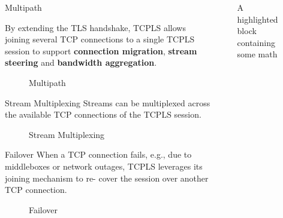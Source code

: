 \documentclass[final]{beamer}
\newlength{\sepwidth}
\newlength{\colwidth}
\newcommand{\separatorcolumn}{\begin{column}{\sepwidth}\end{column}}
\begin{document}
\begin{frame}[t]
\begin{columns}[t]
\begin{column}{\colwidth}
      \end{column}

      \separatorcolumn

      \begin{column}{\colwidth}
        \begin{block}{Multipath}

          By extending the TLS handshake, TCPLS allows joining several TCP connections to a
          single TCPLS session to support \textbf{connection migration},
          \textbf{stream steering} and \textbf{bandwidth aggregation}.
        \begin{figure}
          \centering
          
          \caption{Multipath}
          \label{fig:multipath}
        \end{figure}


        \end{block}

        \begin{block}{Stream Multiplexing}
          Streams can be multiplexed across the available TCP connections of the TCPLS session.
          \begin{figure}
            \centering
            
            \caption{Stream Multiplexing}
            \label{fig:stream-multiplex}
          \end{figure}
        \end{block}



        \begin{block}{Failover}
          When a TCP connection fails, e.g., due to middleboxes
          or network outages, TCPLS leverages its joining mechanism to re-
          cover the session over another TCP connection.
           \begin{figure}
            \centering
            
            \caption{Failover}
            \label{fig:failover}
          \end{figure}

        \end{block}

      \end{column}

      \separatorcolumn

      \begin{column}{\colwidth}

        \begin{exampleblock}{A highlighted block containing some math}


\end{exampleblock}
\end{column}
\end{columns}
\end{frame}
\end{document}
